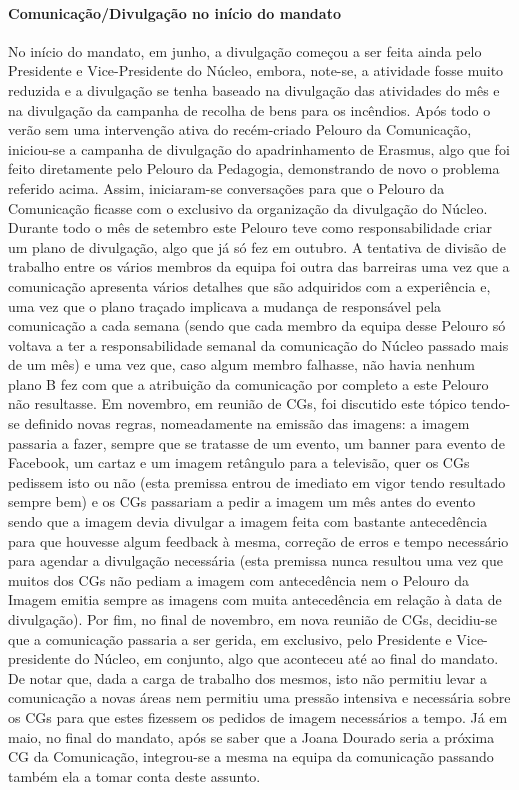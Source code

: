 \paragraph{Comunicação/Divulgação no início do mandato}
No início do mandato, em junho, a divulgação começou a ser feita ainda pelo Presidente e Vice-Presidente do Núcleo, embora, note-se, a atividade fosse muito reduzida e a divulgação se tenha baseado na divulgação das atividades do mês e na divulgação da campanha de recolha de bens para os incêndios. Após todo o verão sem uma intervenção ativa do recém-criado Pelouro da Comunicação, iniciou-se a campanha de divulgação do apadrinhamento de Erasmus, algo que foi feito diretamente pelo Pelouro da Pedagogia, demonstrando de novo o problema referido acima. Assim, iniciaram-se conversações para que o Pelouro da Comunicação ficasse com o exclusivo da organização da divulgação do Núcleo. Durante todo o mês de setembro este Pelouro teve como responsabilidade criar um plano de divulgação, algo que já só fez em outubro. A tentativa de divisão de trabalho entre os vários membros da equipa foi outra das barreiras uma vez que a comunicação apresenta vários detalhes que são adquiridos com a experiência e, uma vez que o plano traçado implicava a mudança de responsável pela comunicação a cada semana (sendo que cada membro da equipa desse Pelouro só voltava a ter a responsabilidade semanal da comunicação do Núcleo passado mais de um mês) e uma vez que, caso algum membro falhasse, não havia nenhum plano B fez com que a atribuição da comunicação por completo a este Pelouro não resultasse. Em novembro, em reunião de CGs, foi discutido este tópico tendo-se definido novas regras, nomeadamente na emissão das imagens: a imagem passaria a fazer, sempre que se tratasse de um evento, um banner para evento de Facebook, um cartaz e um imagem retângulo para a televisão, quer os CGs pedissem isto ou não (esta premissa entrou de imediato em vigor tendo resultado sempre bem) e os CGs passariam a pedir a imagem um mês antes do evento sendo que a imagem devia divulgar a imagem feita com bastante antecedência para que houvesse algum feedback à mesma, correção de erros e tempo necessário para agendar a divulgação necessária (esta premissa nunca resultou uma vez que muitos dos CGs não pediam a imagem com antecedência nem o Pelouro da Imagem emitia sempre as imagens com muita antecedência em relação à data de divulgação). Por fim, no final de novembro, em nova reunião de CGs, decidiu-se que a comunicação passaria a ser gerida, em exclusivo, pelo Presidente e Vice-presidente do Núcleo, em conjunto, algo que aconteceu até ao final do mandato. De notar que, dada a carga de trabalho dos mesmos, isto não permitiu levar a comunicação a novas áreas nem permitiu uma pressão intensiva e necessária sobre os CGs para que estes fizessem os pedidos de imagem necessários a tempo. Já em maio, no final do mandato, após se saber que a Joana Dourado seria a próxima CG da Comunicação, integrou-se a mesma na equipa da comunicação passando também ela a tomar conta deste assunto.


